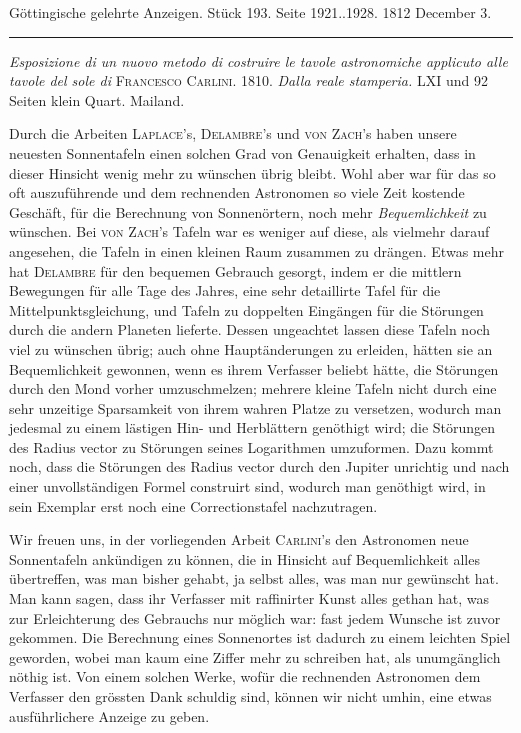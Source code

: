 \clearpage
{}
\hypertarget{native-548-lower}{}\label{native-548-lower}
\begin{center}\small Göttingische gelehrte Anzeigen. Stück 193. Seite 1921..1928. 1812 December 3.\\[3pt]\rule{.72\linewidth}{.3pt}\end{center}

\emph{Esposizione di un nuovo metodo di costruire le tavole astronomiche applicuto alle tavole del sole di} \textsc{Francesco Carlini}. 1810. \emph{Dalla reale stamperia.} LXI und 92 Seiten klein Quart. Mailand.

Durch die Arbeiten \textsc{Laplace}'s, \textsc{Delambre}'s und \textsc{von Zach}'s haben unsere neuesten Sonnentafeln einen solchen Grad von Genauigkeit erhalten, dass in dieser Hinsicht wenig mehr zu wünschen übrig bleibt. Wohl aber war für das so oft auszuführende und dem rechnenden Astronomen so viele Zeit kostende Geschäft, für die Berechnung von Sonnenörtern, noch mehr \emph{Bequemlichkeit} zu wünschen. Bei \textsc{von Zach}'s Tafeln war es weniger auf diese, als vielmehr darauf angesehen, die Tafeln in einen kleinen Raum zusammen zu drängen. Etwas mehr hat \textsc{Delambre} für den bequemen Gebrauch gesorgt, indem er die mittlern Bewegungen für alle Tage des Jahres, eine sehr detaillirte Tafel für die Mittelpunktsgleichung, und Tafeln zu doppelten Eingängen für die Störungen durch die andern Planeten lieferte. Dessen ungeachtet lassen diese Tafeln noch viel zu wünschen übrig; auch ohne Hauptänderungen zu erleiden, hätten sie an Bequemlichkeit gewonnen, wenn es ihrem Verfasser beliebt hätte, die Störungen durch den Mond vorher umzuschmelzen; mehrere kleine Tafeln nicht durch eine sehr unzeitige Sparsamkeit von ihrem wahren Platze zu versetzen, wodurch man jedesmal zu einem lästigen Hin- und Herblättern genöthigt wird; die Störungen des Radius vector zu Störungen seines Logarithmen umzuformen. Dazu kommt noch, dass die Störungen des Radius vector durch den Jupiter unrichtig und nach einer unvollständigen Formel construirt sind, wodurch man genöthigt wird, in sein Exemplar erst noch eine Correctionstafel nachzutragen.

Wir freuen uns, in der vorliegenden Arbeit \textsc{Carlini}'s den Astronomen neue Sonnentafeln ankündigen zu können, die in Hinsicht auf Bequemlichkeit alles übertreffen, was man bisher gehabt, ja selbst alles, was man nur gewünscht hat. Man kann sagen, dass ihr Verfasser mit raffinirter Kunst alles gethan hat, was zur Erleichterung des Gebrauchs nur möglich war: fast jedem Wunsche ist zuvor gekommen. Die Berechnung eines Sonnenortes ist dadurch zu einem leichten Spiel geworden, wobei man kaum eine Ziffer mehr zu schreiben hat, als unumgänglich nöthig ist. Von einem solchen Werke, wofür die rechnenden Astronomen dem Verfasser den grössten Dank schuldig sind, können wir nicht umhin, eine etwas ausführlichere Anzeige zu geben.

